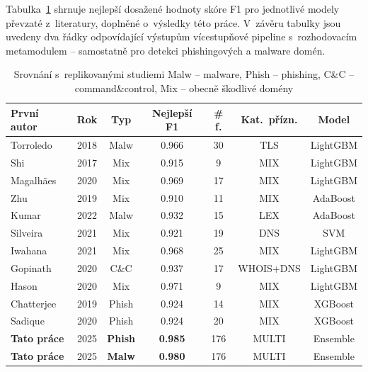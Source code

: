 Tabulka~\ref{tab:method_comparison_final} shrnuje nejlepší dosažené hodnoty skóre F1 pro jednotlivé modely převzaté z~literatury, doplněné o~výsledky této práce. V~závěru tabulky jsou uvedeny dva řádky odpovídající výstupům vícestupňové pipeline s~rozhodovacím metamodulem – samostatně pro detekci phishingových a malware domén.

\begin{table}[H]
  \centering
  \begin{tabular}{@{}lcccccc@{}}
    \toprule
    \textbf{První autor} & \textbf{Rok} & \textbf{Typ} &
    \textbf{Nejlepší F1} & \textbf{\# f.} &
    \textbf{Kat.\ přízn.} & \textbf{Model}\\
    \midrule
    Torroledo   & 2018 & Malw   & 0.966 & 30  & TLS           & LightGBM\\
    Shi         & 2017 & Mix    & 0.915 & 9   & MIX           & LightGBM\\
    Magalhães   & 2020 & Mix    & 0.969 & 17  & MIX           & LightGBM\\
    Zhu         & 2019 & Mix    & 0.910 & 11  & MIX           & AdaBoost\\
    Kumar       & 2022 & Malw   & 0.932 & 15  & LEX           & AdaBoost\\
    Silveira    & 2021 & Mix    & 0.921 & 19  & DNS           & SVM\\
    Iwahana     & 2021 & Mix    & 0.968 & 25  & MIX           & LightGBM\\
    Gopinath    & 2020 & C\&C   & 0.937 & 17  & WHOIS+DNS     & LightGBM\\
    Hason       & 2020 & Mix    & 0.971 & 9   & MIX           & LightGBM\\
    Chatterjee  & 2019 & Phish  & 0.924 & 14  & MIX           & XGBoost\\
    Sadique     & 2020 & Phish  & 0.924 & 20  & MIX           & XGBoost\\
    \rowcolor{gray!10}
    \textbf{Tato práce} & 2025 & \textbf{Phish} & \textbf{0.985} & 176 & MULTI & Ensemble\\
    \rowcolor{gray!10}
    \textbf{Tato práce}  & 2025 & \textbf{Malw}  & \textbf{0.980} & 176 & MULTI & Ensemble\\
    \bottomrule
  \end{tabular}
  \caption{Srovnání s~replikovanými studiemi\newline%
    {\small Malw – malware, Phish – phishing, C\&C – command\&control, Mix – obecně škodlivé domény}}
  \label{tab:method_comparison_final}
\end{table}

